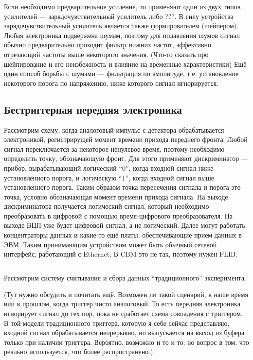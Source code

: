 Если необходимо предварительное усиление, то применяют один из двух типов усилителей --- зарядочувствительный усилитель либо ???. В силу устройства зарядочувствительный усилитель является также формирователем (шейпером). Любая электроника подвержена шумам, поэтому для подавления шумов сигнал обычно предварительно проходит фильтр нижних частот, эффективно отрезающий частоты выше некоторого значения. (Что-то сказать про шейпирование и его неизбежность и влияние на временные характеристики) Ещё один способ борьбы с шумами --- фильтрация по амплитуде, т.е. установление некоторого порога по напряжению, ниже которого сигнал игнорируется. 

\subsection{Бестриггерная передняя электроника}

Рассмотрим схему, когда аналоговый импульс с детектора обрабатывается электроникой, регистрирущей момент времени прихода переднего фронта. Любой сигнал переключается за некоторое ненулевое время, поэтому необходимо определить точку, обозначающую фронт. Для этого применяют дискриминатор --- прибор, вырабатывающий логический ``0'', когда входной сигнал ниже установленного порога, и логическую ``1'', когда входной сигнал выше установленного порога. Таким образом точка пересечения сигнала и порога это точка, условно обозначающая момент времени прихода сигнала. На выходе дискриминатора получается логический сигнал, который необходимо преобразовать в цифровой с помощью время-цифрового преобразователя. На выходе ВЦП уже будет цифровой сигнал, а не логический. Далее могут работать концентраторы данных и какие-то ещё платы, обеспечивающие приём данных в ЭВМ. Таким принимающим устройством может быть обычный сетевой интерфейс, работающий с Ethernet. В CBM это не так, поэтому нужен FLIB.

\subsection{}

Рассмотрим систему считывания и сбора данных ``традиционного'' эксперимента.

(Тут нужно обсудить и почитать ещё. Возможен ли такой сценарий, в наше время или в прошлом, когда триггер чисто аналоговый. То есть передняя электроника игнорирует сигнал до тех пор, пока не сработает схема совпадения с триггером. В той модели традиционного триггера, которую я себе сейчас представляю, входной сигнал обрабатывается непрерывно, но выпускается на выход из буфера только при наличии триггера. Вероятно, возможно и то и то, но вопрос в том, что реально используется, что более распространено.)

